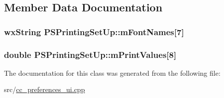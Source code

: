 \subsection{Member Data Documentation}
\hypertarget{a00121_aecf76480b10bd1b30267f63d77a23456}{
\subsubsection[{m\-Font\-Names}]{\setlength{\rightskip}{0pt plus 5cm}wx\-String P\-S\-Printing\-Set\-Up\-::m\-Font\-Names\mbox{[}7\mbox{]}\hspace{0.3cm}{\ttfamily [private]}}}\label{a00121_aecf76480b10bd1b30267f63d77a23456}
\hypertarget{a00121_aff7fe767ce657f691b0b070bfcb995b2}{
\subsubsection[{m\-Print\-Values}]{\setlength{\rightskip}{0pt plus 5cm}double P\-S\-Printing\-Set\-Up\-::m\-Print\-Values\mbox{[}8\mbox{]}\hspace{0.3cm}{\ttfamily [private]}}}\label{a00121_aff7fe767ce657f691b0b070bfcb995b2}


The documentation for this class was generated from the following file\-:\begin{DoxyCompactItemize}
\item 
src/\hyperlink{a00187}{cc\-\_\-preferences\-\_\-ui.\-cpp}\end{DoxyCompactItemize}
